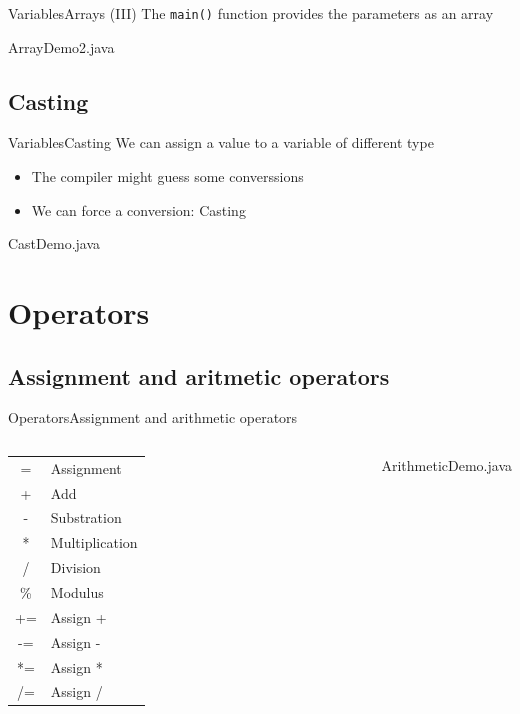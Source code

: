 \documentclass[10pt,compress]{beamer} %
\begin{document}
\begin{frame}{Variables}{Arrays (III)}
	The \texttt{main()} function provides the parameters as an array
	\begin{block}{ArrayDemo2.java}
		
	\end{block}
\end{frame}

\subsection{Casting}

\begin{frame}{Variables}{Casting}
	We can assign a value to a variable of different type
		\begin{itemize}
		    \item The compiler might guess some converssions
		    \item We can force a conversion: \alert{Casting}
		\end{itemize}
	\begin{block}{CastDemo.java}
	\vspace{-0.2cm}
		
	\vspace{-0.2cm}
	\end{block}
\end{frame}


\section{Operators}
\subsection{Assignment and aritmetic operators}

\begin{frame}{Operators}{Assignment and arithmetic operators}
    \begin{columns}
		\centering \begin{tabular}{cl}
		= & Assignment  \\
		+ & Add  		\\
		- & Substration \\
		* & Multiplication \\
		/ & Division 	\\
		\%& Modulus		\\ 
		+= & Assign + 	\\
		-= & Assign - 	\\
		*= & Assign * 	\\
		/= & Assign / 	\\
		\end{tabular}
		\begin{block}{ArithmeticDemo.java}
		
		\end{block}
	\end{columns}
\end{frame}
\end{document}
